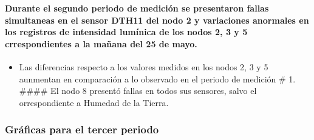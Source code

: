 \documentclass[11pt]{article}
\providecommand{\tightlist}{%
      \setlength{\itemsep}{0pt}\setlength{\parskip}{0pt}}
\begin{document}
    \begin{center}
    \end{center}
    { \hspace*{\fill} \\}
    
    \paragraph{Durante el segundo periodo de medición se presentaron fallas
simultaneas en el sensor DTH11 del nodo 2 y variaciones anormales en los
registros de intensidad lumínica de los nodos 2, 3 y 5 crrespondientes a
la mañana del 25 de
mayo.}\label{durante-el-segundo-periodo-de-mediciuxf3n-se-presentaron-fallas-simultaneas-en-el-sensor-dth11-del-nodo-2-y-variaciones-anormales-en-los-registros-de-intensidad-lumuxednica-de-los-nodos-2-3-y-5-crrespondientes-a-la-mauxf1ana-del-25-de-mayo.}

\begin{itemize}
\tightlist
\item
  Las diferencias respecto a los valores medidos en los nodos 2, 3 y 5
  aunmentan en comparación a lo observado en el periodo de medición \#
  1. \#\#\#\# El nodo 8 presentó fallas en todos sus sensores, salvo el
  orrespondiente a Humedad de la Tierra.
\end{itemize}

\subsubsection{Gráficas para el tercer
periodo}\label{gruxe1ficas-para-el-tercer-periodo}
\end{document}
